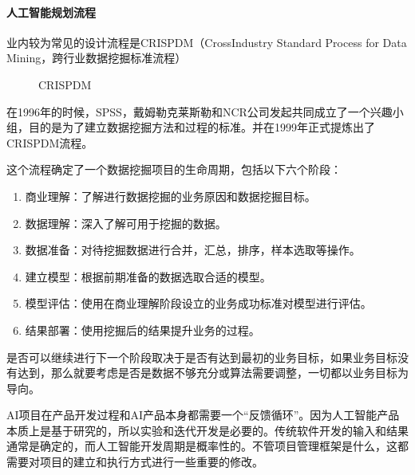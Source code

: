 \documentclass[letterpaper,11pt,english]{sphinxmanual}
\begin{document}
\paragraph{人工智能规划流程}
\label{\detokenize{chapter_project/process:id13}}
业内较为常见的设计流程是CRISP\sphinxhyphen{}DM（Cross\sphinxhyphen{}Industry Standard Process for
Data Mining，跨行业数据挖掘标准流程）

\begin{figure}[H]
\centering
\capstart

\noindent{}
\caption{CRISP\sphinxhyphen{}DM}\label{\detokenize{chapter_project/process:id36}}\end{figure}

在1996年的时候，SPSS，戴姆勒\sphinxhyphen{}克莱斯勒和NCR公司发起共同成立了一个兴趣小组，目的是为了建立数据挖掘方法和过程的标准。并在1999年正式提炼出了CRISP\sphinxhyphen{}DM流程。

这个流程确定了一个数据挖掘项目的生命周期，包括以下六个阶段：
\begin{enumerate}
%
\item {} 
商业理解：了解进行数据挖掘的业务原因和数据挖掘目标。

\item {} 
数据理解：深入了解可用于挖掘的数据。

\item {} 
数据准备：对待挖掘数据进行合并，汇总，排序，样本选取等操作。

\item {} 
建立模型：根据前期准备的数据选取合适的模型。

\item {} 
模型评估：使用在商业理解阶段设立的业务成功标准对模型进行评估。

\item {} 
结果部署：使用挖掘后的结果提升业务的过程。

\end{enumerate}

是否可以继续进行下一个阶段取决于是否有达到最初的业务目标，如果业务目标没有达到，那么就要考虑是否是数据不够充分或算法需要调整，一切都以业务目标为导向。

AI项目在产品开发过程和AI产品本身都需要一个“反馈循环”。因为人工智能产品本质上是基于研究的，所以实验和迭代开发是必要的。传统软件开发的输入和结果通常是确定的，而人工智能开发周期是概率性的。不管项目管理框架是什么，这都需要对项目的建立和执行方式进行一些重要的修改。%
\begin{footnote}[273]\sphinxAtStartFootnote
{}
%
\end{footnote}
\end{document}
